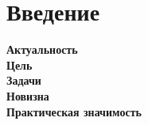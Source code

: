 \section{Введение}
\label{sec:Chapter0} 

\textbf{Актуальность} \\
\textbf{Цель} \\
\textbf{Задачи} \\
\textbf{Новизна} \\
\textbf{Практическая значимость} \\

\newpage
